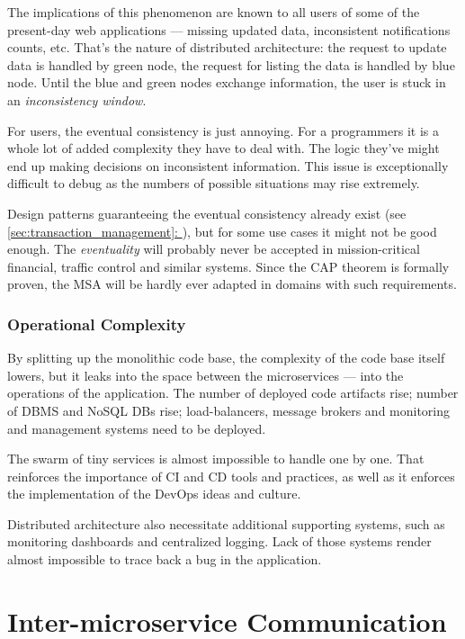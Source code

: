 \documentclass[thesis=M,english,hidelinks]{FITthesis}[2012/10/20]
\newcommand*{\fullref}[1]{\hyperref[{#1}]{\autoref*{#1}: \textit{\nameref*{#1}}}}
\begin{document}
The implications of this phenomenon are known to all users of some of the present-day web applications --- missing updated data, inconsistent notifications counts, etc. That's the nature of distributed architecture: the request to update data is handled by green node, the request for listing the data is handled by blue node. Until the blue and green nodes exchange information, the user is stuck in an \textit{inconsistency window}.

For users, the eventual consistency is just annoying. For a programmers it is a whole lot of added complexity they have to deal with. The logic they've might end up making decisions on inconsistent information. This issue is exceptionally difficult to debug as the numbers of possible situations may rise extremely.

Design patterns guaranteeing the eventual consistency already exist (see \fullref{sec:transaction_management}), but for some use cases it might not be good enough. The \textit{eventuality} will probably never be accepted in mission-critical financial, traffic control and similar systems. Since the \acrshort{CAP} theorem is formally proven, the \acrshort{MSA} will be hardly ever adapted in domains with such requirements.

\subsubsection{Operational Complexity}
By splitting up the monolithic code base, the complexity of the code base itself lowers, but it leaks into the space between the microservices --- into the operations of the application. The number of deployed code artifacts rise; number of \acrshort{DBMS} and NoSQL \acrshort{DB}s rise; load-balancers, message brokers and monitoring and management systems need to be deployed.

The swarm of tiny services is almost impossible to handle one by one. That reinforces the importance of \acrfull{CI} and \acrfull{CD} tools and practices, as well as it enforces the implementation of the DevOps ideas and culture.

Distributed architecture also necessitate additional supporting systems, such as monitoring dashboards and centralized logging. Lack of those systems render almost impossible to trace back a bug in the application.

% 
% 

\section{Inter-microservice Communication}
\label{sec:inter-service-communication}
\end{document}
